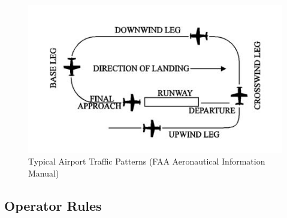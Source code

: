 \documentclass[
  12pt,
]{book}
\begin{document}
\begin{figure}

{\centering \includegraphics[width=0.6\linewidth]{images/faa_traffic_pattern} 

}

\caption{Typical Airport Traffic Patterns (FAA Aeronautical Information Manual)}\label{fig:traffic-patterns}
\end{figure}

\hypertarget{operator-rules}{%
\subsection{Operator Rules}\label{operator-rules}}
\end{document}
